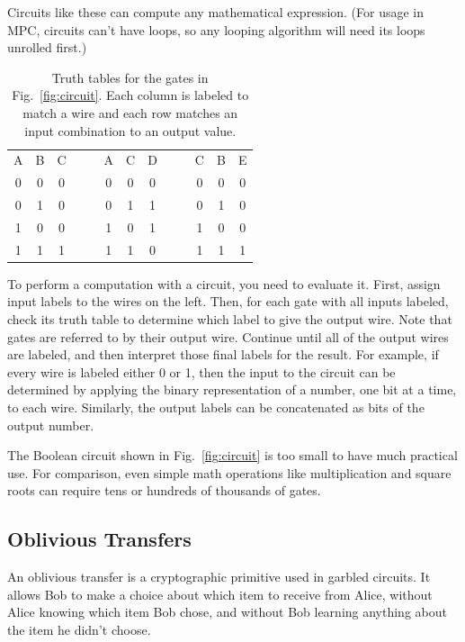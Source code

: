 Circuits like these can compute any mathematical expression. (For usage in MPC, circuits can't have loops, so any looping algorithm will need its loops unrolled first.)

\begin{table}[ht]
	\centering %
	\begin{tabular}{cc|c   cc   cc|c   cc   cc|c}
		A & B & C   &&&   A & C & D   &&&   C & B & E \\
		\cmidrule{1-3}    \cmidrule{6-8}    \cmidrule{11-13}
		0 & 0 & 0   &&&   0 & 0 & 0   &&&   0 & 0 & 0 \\
		0 & 1 & 0   &&&   0 & 1 & 1   &&&   0 & 1 & 0 \\
		1 & 0 & 0   &&&   1 & 0 & 1   &&&   1 & 0 & 0 \\
		1 & 1 & 1   &&&   1 & 1 & 0   &&&   1 & 1 & 1 \\
	\end{tabular}
	\caption{Truth tables for the gates in Fig.~\ref{fig:circuit}. Each column is labeled to match a wire and each row matches an input combination to an output value.}%
	\label{tab:truth-table}
\end{table}

To perform a computation with a circuit, you need to evaluate it. First, assign input labels to the wires on the left. Then, for each gate with all inputs labeled, check its truth table to determine which label to give the output wire. Note that gates are referred to by their output wire. Continue until all of the output wires are labeled, and then interpret those final labels for the result. For example, if every wire is labeled either 0 or 1, then the input to the circuit can be determined by applying the binary representation of a number, one bit at a time, to each wire. Similarly, the output labels can be concatenated as bits of the output number.

The Boolean circuit shown in Fig.~\ref{fig:circuit} is too small to have much practical use. For comparison, even simple math operations like multiplication and square roots can require tens or hundreds of thousands of gates\cite{bristol}.

\subsection{Oblivious Transfers}
An oblivious transfer is a cryptographic primitive used in garbled circuits. It allows Bob to make a choice about which item to receive from Alice, without Alice knowing which item Bob chose, and without Bob learning anything about the item he didn't choose\cite{FirstOT}.

